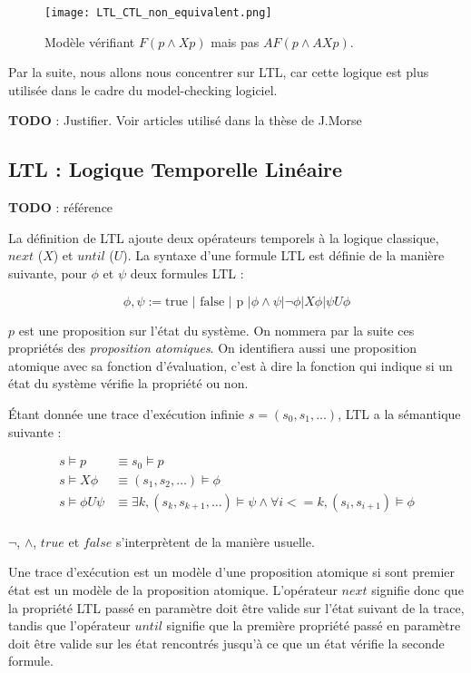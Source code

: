 \begin{figure}
\begin{center}
\texttt{[image: LTL\_CTL\_non\_equivalent.png]}
\caption{Modèle vérifiant \(F (p \land X p)\) mais pas \(AF (p \land AX p)\).}
\label{LTL_vs_CTL}
\end{center}
\end{figure}

Par la suite, nous allons nous concentrer sur LTL, car cette logique est
plus utilisée dans le cadre du model-checking logiciel.

\textbf{TODO} : Justifier. Voir articles utilisé dans la thèse de
J.Morse

\subsection{LTL : Logique Temporelle Linéaire}

\textbf{TODO} : référence

La définition de LTL ajoute deux opérateurs temporels à la logique
classique, \(next\) (\(X\)) et \(until\) (\(U\)). La syntaxe d'une
formule LTL est définie de la manière suivante, pour \(\phi\) et \(\psi\)
deux formules LTL :

\[
\phi, \psi := \text{true }| \text{ false } | \text{ p } |
             \phi \land \psi | \lnot \phi | X \phi | \psi U \phi
\]

\(p\) est une proposition sur l'état du système. On nommera par la suite
ces propriétés des \emph{proposition atomiques}. On identifiera aussi
une proposition atomique avec sa fonction d'évaluation, c'est à dire la
fonction qui indique si un état du système vérifie la propriété ou non.

Étant donnée une trace d'exécution infinie \(s = (s_0, s_1, ...)\), LTL a
la sémantique suivante :

\[
\begin{aligned}
s \models p & \equiv s_0 \models p \\
s \models X \phi & \equiv (s_1, s_2, \dots) \models \phi \\
s \models \phi U \psi & \equiv \exists k, (s_k, s_{k+1}, \dots) \models \psi
                        \land \forall i <= k, (s_i, s_{i+1}) \models \phi \\
\end{aligned}
\]

\(\lnot\), \(\land\), \(true\) et \(false\) s'interprètent de la manière
usuelle.

Une trace d'exécution est un modèle d'une proposition atomique si sont premier
état est un modèle de la proposition atomique.
L'opérateur \(next\) signifie donc que la propriété LTL passé en
paramètre doit être valide sur l'état suivant de la trace, tandis que
l'opérateur \(until\) signifie que la première propriété passé en
paramètre doit être valide sur les état rencontrés jusqu'à ce que un
état vérifie la seconde formule.


